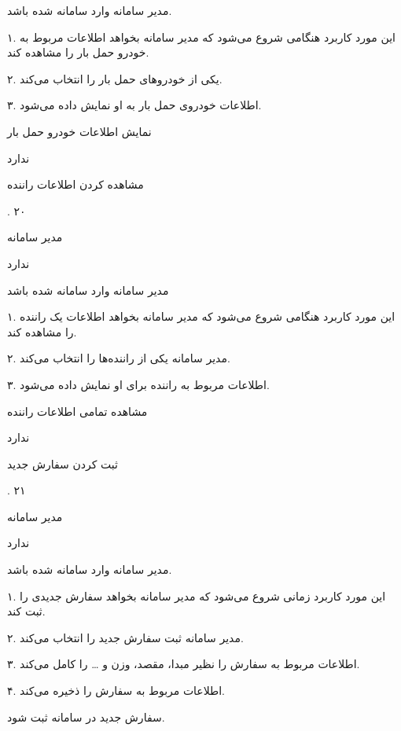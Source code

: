 مدیر سامانه وارد سامانه شده باشد.


۱. این مورد کاربرد هنگامی شروع می‌شود که مدیر سامانه بخواهد اطلاعات مربوط به خودرو حمل بار را مشاهده کند.

۲. یکی از خودروهای حمل بار را انتخاب می‌کند.

۳. اطلاعات خودروی حمل بار به او نمایش داده می‌شود.

نمایش اطلاعات خودرو حمل بار

ندارد

\newpage



مشاهده کردن اطلاعات راننده

.
۲۰

مدیر سامانه

ندارد

مدیر سامانه وارد سامانه شده باشد


۱. این مورد کاربرد هنگامی شروع می‌شود که مدیر سامانه بخواهد اطلاعات یک راننده را مشاهده کند.

۲. مدیر سامانه یکی از راننده‌ها را انتخاب می‌کند.

۳. اطلاعات مربوط به راننده برای او نمایش داده می‌شود.

مشاهده تمامی اطلاعات راننده

ندارد

\newpage

ثبت کردن سفارش جدید

.
۲۱

مدیر سامانه

ندارد

مدیر سامانه وارد سامانه شده باشد.


۱. این مورد کاربرد زمانی شروع می‌شود که مدیر سامانه بخواهد سفارش جدیدی را ثبت کند.

۲. مدیر سامانه ثبت سفارش جدید را انتخاب می‌کند.

۳. اطلاعات مربوط به سفارش را نظیر مبدا، مقصد، وزن و … را کامل می‌کند.

۴. اطلاعات مربوط به سفارش را ذخیره می‌کند.

سفارش جدید در سامانه ثبت شود.

